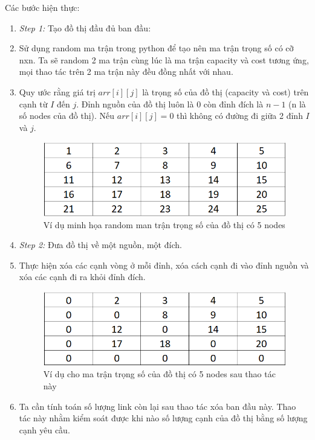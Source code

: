 \documentclass[a4paper]{article}
\begin{document}
{Các bước hiện thực:} 
\begin{enumerate}
    \item[] {\textit{Step 1:} Tạo đồ thị đầu đủ ban đầu: }
    \item[] {Sử dụng random ma trận trong python để tạo nên ma trận trọng số có cỡ nxn. Ta sẽ random 2 ma trận cùng lúc là ma trận capacity và cost tương ứng, mọi thao tác trên 2 ma trận này đều đồng nhất với nhau. }
    \item[] {Quy ước rằng giá trị $arr[i][j]$ là trọng số của đồ thị (capacity và cost) trên cạnh từ $I$ đến $j$. Đỉnh nguồn của đồ thị luôn là 0 còn đỉnh đích là $n-1$ (n là số nodes của đồ thị). Nếu $arr[i][j] = 0$ thì không có đường đi giữa 2 đỉnh $I$ và $j$. } 
    \begin{figure}[h]
        \centering
        \includegraphics[scale=0.8]{table_2.png}
        \caption{Ví dụ minh họa random man trận trọng số của đồ thị có 5 nodes}
        \label{fig:enter-label}
    \end{figure}
    \item[] {\textit{Step 2:} Đưa đồ thị về một nguồn, một đích. } 
    \item[] {Thực hiện xóa các cạnh vòng ở mỗi đỉnh, xóa cách cạnh đi vào đỉnh nguồn và xóa các cạnh đi ra khỏi đỉnh đích. } 
    \begin{figure}[h]
        \centering
        \includegraphics[scale=0.8]{table_3.png}
        \caption{Ví dụ cho ma trận trọng số của đồ thị có 5 nodes sau thao tác này}
        \label{fig:enter-label}
    \end{figure}
    \item[] {Ta cần tính toán số lượng link còn lại sau thao tác xóa ban đầu này. Thao tác này nhằm kiểm soát được khi nào số lượng cạnh của đồ thị bằng số lượng cạnh yêu cầu.}

\end{enumerate}
\end{document}
